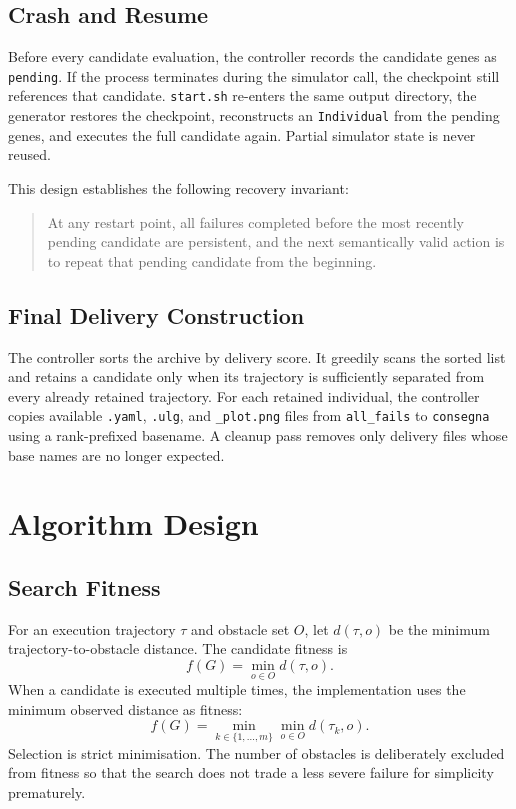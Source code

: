 \documentclass[11pt,a4paper,openany]{report}
\newcommand{\code}[1]{\texttt{#1}}
\begin{document}
\subsection{Crash and Resume}
Before every candidate evaluation, the controller records the candidate genes as \code{pending}. If the process terminates during the simulator call, the checkpoint still references that candidate. \code{start.sh} re-enters the same output directory, the generator restores the checkpoint, reconstructs an \code{Individual} from the pending genes, and executes the full candidate again. Partial simulator state is never reused.

This design establishes the following recovery invariant:
\begin{quote}
At any restart point, all failures completed before the most recently pending candidate are persistent, and the next semantically valid action is to repeat that pending candidate from the beginning.
\end{quote}

\subsection{Final Delivery Construction}
The controller sorts the archive by delivery score. It greedily scans the sorted list and retains a candidate only when its trajectory is sufficiently separated from every already retained trajectory. For each retained individual, the controller copies available \code{.yaml}, \code{.ulg}, and \code{\_plot.png} files from \code{all\_fails} to \code{consegna} using a rank-prefixed basename. A cleanup pass removes only delivery files whose base names are no longer expected.

\section{Algorithm Design}

\subsection{Search Fitness}
For an execution trajectory $\tau$ and obstacle set $O$, let $d(\tau,o)$ be the minimum trajectory-to-obstacle distance. The candidate fitness is
\[
f(G)=\min_{o\in O} d(\tau,o).
\]
When a candidate is executed multiple times, the implementation uses the minimum observed distance as fitness:
\[
f(G)=\min_{k\in\{1,\ldots,m\}}\min_{o\in O}d(\tau_k,o).
\]
Selection is strict minimisation. The number of obstacles is deliberately excluded from fitness so that the search does not trade a less severe failure for simplicity prematurely.
\end{document}

